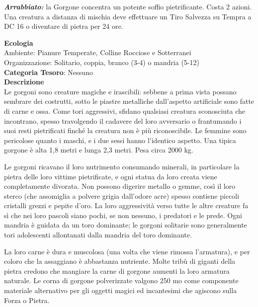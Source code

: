 \begin{multicols}{2}
{\emph{\textbf{Arrabbiato:}} la Gorgone concentra un potente soffio pietrificante. Costa 2 azioni. Una creatura a distanza di mischia deve effettuare un Tiro Salvezza su Tempra a DC 16 o diventare di pietra per 24 ore.

\textbf{Ecologia}\\
Ambiente: Pianure Temperate, Colline Rocciose e Sotterranei\\
Organizzazione: Solitario, coppia, branco (3-4) o mandria (5-12)\\
\textbf{Categoria Tesoro}: Nessuno\\
\textbf{Descrizione}\\
Le gorgoni sono creature magiche e irascibili: sebbene a prima vista possano sembrare dei costrutti, sotto le piastre metalliche dall'aspetto artificiale sono fatte di carne e ossa. Come tori aggressivi, sfidano qualsiasi creatura sconosciuta che incontrano, spesso travolgendo il cadavere del loro avversario o frantumando i suoi resti pietrificati finché la creatura non è più riconoscibile. Le femmine sono pericolose quanto i maschi, e i due sessi hanno l'identico aspetto. Una tipica gorgone è alta 1,8 metri e lunga 2,3 metri. Pesa circa 2000 kg.

Le gorgoni ricavano il loro nutrimento consumando minerali, in particolare la pietra delle loro vittime pietrificate, e ogni statua da loro creata viene completamente divorata. Non possono digerire metallo o gemme, così il loro sterco (che assomiglia a polvere grigia dall'odore acre) spesso contiene piccoli cristalli grezzi e pepite d'oro. La loro aggressività verso tutte le altre creature fa sì che nei loro pascoli siano pochi, se non nessuno, i predatori e le prede. Ogni mandria è guidata da un toro dominante; le gorgoni solitarie sono generalmente tori adolescenti allontanati dalla mandria del toro dominante.

La loro carne è dura e muscolosa (una volta che viene rimossa l'armatura), e per coloro che la assaggiano è abbastanza nutriente. Molte tribù di giganti della pietra credono che mangiare la carne di gorgone aumenti la loro armatura naturale. Le corna di gorgone polverizzate valgono 250 mo come componente materiale alternativo per gli oggetti magici ed incantesimi che agiscono sulla Forza o Pietra.

}
\end{multicols}
